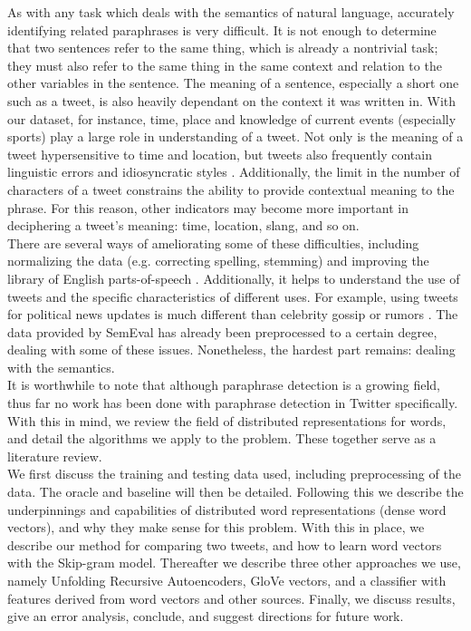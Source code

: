 \documentclass[conference]{IEEEtran}
\begin{document}
\indent As with any task which deals with the semantics of natural language, accurately identifying related paraphrases is very difficult.  It is not enough to determine that two sentences refer to the same thing, which is already a nontrivial task; they must also refer to the same thing in the same context and relation to the other variables in the sentence.  The meaning of a sentence, especially a short one such as a tweet, is also heavily dependant on the context it was written in.  With our dataset, for instance, time, place and knowledge of current events (especially sports) play a large role in understanding of a tweet. Not only is the meaning of a tweet hypersensitive to time and location, but tweets also frequently contain linguistic errors and idiosyncratic styles \cite{derczynski}. Additionally, the limit in the number of characters of a tweet constrains the ability to provide contextual meaning to the phrase. For this reason, other indicators may become more important in deciphering a tweet's meaning: time, location, slang, and so on.\\

\indent There are several ways of ameliorating some of these difficulties, including normalizing the data (e.g. correcting spelling, stemming) and improving the library of English parts-of-speech \cite{derczynski}. Additionally, it helps to understand the use of tweets and the specific characteristics of different uses. For example, using tweets for political news updates is much different than celebrity gossip or rumors \cite{OConnor}.  The data provided by SemEval has already been preprocessed to a certain degree, dealing with some of these issues.  Nonetheless, the hardest part remains: dealing with the semantics.\\

\indent It is worthwhile to note that although paraphrase detection is a growing field, thus far no work has been done with paraphrase detection in Twitter specifically.  With this in mind, we review the field of distributed representations for words, and detail the algorithms we apply to the problem.  These together serve as a literature review.\\

\indent We first discuss the training and testing data used, including preprocessing of the data.   The oracle and baseline will then be detailed.  Following this we describe the underpinnings and capabilities of distributed word representations (dense word vectors), and why they make sense for this problem.  With this in place, we describe our method for comparing two tweets, and how to learn word vectors with the Skip-gram model.  Thereafter we describe three other approaches we use, namely Unfolding Recursive Autoencoders, GloVe vectors, and a classifier with features derived from word vectors and other sources.  Finally, we discuss results, give an error analysis, conclude, and suggest directions for future work.
\end{document}
